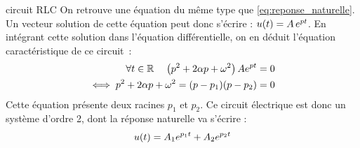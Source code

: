 \begin{remark}{}
\begin{exemple}{circuit RLC}
          On retrouve une équation du même type que
          \ref{eq:reponse_naturelle}. Un vecteur solution de cette
          équation peut donc s'écrire : $u(t) = A\,e^{pt}$. En intégrant
          cette solution dans l'équation différentielle, on en déduit
          l'équation caractéristique de ce circuit~:
          \begin{eqnarray}
            \label{eq:carac_RLC}
            \forall t\in\mathbb{R}\;\;\;\; \left(p^{2}+2\alpha p+\omega^{2}\right)Ae^{pt}=0 \nonumber\\
            \iff  p^{2}+2\alpha p+\omega^{2}=(p-p_{1})(p-p_{2})=0
          \end{eqnarray}
          Cette équation présente deux racines $p_{1}$ et $p_{2}$. Ce
          circuit électrique est donc un système d'ordre 2, dont la
          réponse naturelle va s'écrire :
          \begin{equation}\label{key}
            u(t) = A_{1}e^{p_{1}t}+A_{2}e^{p_{2}t}
          \end{equation}
          

\end{exemple}
\end{remark}

